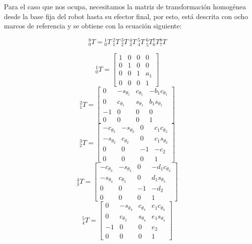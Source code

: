 Para el caso que nos ocupa, necesitamos la matriz de transformación homogénea desde la base fija del robot hasta su efector final, por esto, está descrita con ocho marcos de referencia y se obtiene con la ecuación siguiente:

\begin{equation}
\label{eq:forwardkinematicequation}
{}_{0}^{8}T = {}_{0}^{1}T \ {}_{1}^{2}T \ {}_{2}^{3}T \ {}_{3}^{4}T \ {}_{4}^{5}T \ {}_{5}^{6}T {}_{6}^{7}T {}_{7}^{8}T
\end{equation}

\begin{multicols}{2}
\[
{}_{0}^{1}T = 
\begin{bmatrix}
    1 & 0 & 0 & 0 \\
    0 & 1 & 0 & 0 \\
    0 & 0 & 1 & {a}_1 \\
    0 & 0 & 0 & 1
\end{bmatrix}
\]
\[
{}_{1}^{2}T = 
\begin{bmatrix}
    0 & -s_{\theta_1} & c_{\theta_1} & -b_{1}c_{\theta_1}  \\
    0 & c_{\theta_1} & s_{\theta_1} & b_{1}s_{\theta_1} \\
    -1 & 0 & 0 & 0 \\
    0 & 0 & 0 & 1
\end{bmatrix}
\]
\[
{}_{2}^{3}T = 
\begin{bmatrix}
    -c_{\theta_2} & -s_{\theta_2} & 0 & c_{1}c_{\theta_2}  \\
    -s_{\theta_2} & c_{\theta_2} & 0 & c_{1}s_{\theta_2} \\
    0 & 0 & -1 & -c_2 \\
    0 & 0 & 0 & 1
\end{bmatrix}
\]
\[
{}_{3}^{4}T = 
\begin{bmatrix}
    -c_{\theta_3} & -s_{\theta_3} & 0 & -d_{1}c_{\theta_3}  \\
    -s_{\theta_3} & c_{\theta_3} & 0 & d_{1}s_{\theta_3} \\
    0 & 0 & -1 & -d_2 \\
    0 & 0 & 0 & 1
\end{bmatrix}
\]
\[
{}_{4}^{5}T = 
\begin{bmatrix}
    0 & -s_{\theta_4} & c_{\theta_4} & e_{1}c_{\theta_4}  \\
    0 & c_{\theta_2} & s_{\theta_4} & e_{1}s_{\theta_4} \\
    -1 & 0 & 0 & e_2 \\
    0 & 0 & 0 & 1
\end{bmatrix}
\]


\end{multicols}
